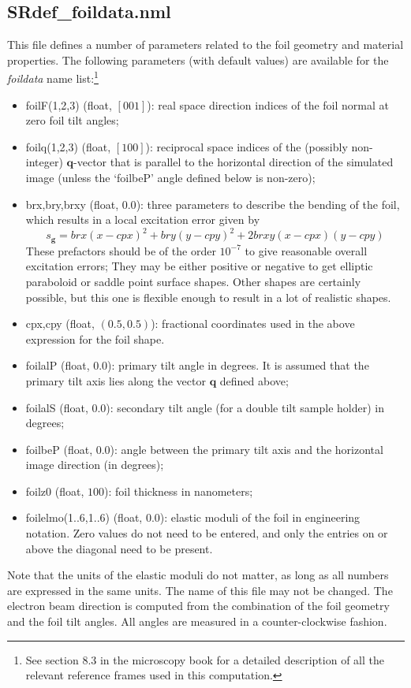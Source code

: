 \documentclass[11pt]{article}
\begin{document}
\subsection{SRdef\_foildata.nml}
This file defines a number of parameters related to the foil geometry and material properties.  The following parameters (with default values) are available for the \textit{foildata} name list:\footnote{See section
8.3 in the microscopy book for a detailed description of all the relevant reference frames used in this computation.}
\begin{itemize}
\item \textsf{foilF(1,2,3)} (float, $[001]$): real space direction indices of the foil normal at zero foil tilt angles;
\item \textsf{foilq(1,2,3)} (float, $[100]$): reciprocal space indices of the (possibly non-integer) $\mathbf{q}$-vector that is parallel to the horizontal direction of the simulated image (unless the `foilbeP' angle defined below is non-zero);
\item \textsf{brx,bry,brxy} (float, $0.0$): three parameters to describe the bending of the foil, which results in a local excitation error given by
\[
	s_\mathbf{g} = brx (x-cpx)^2 + bry (y-cpy)^2 + 2 brxy (x-cpx)(y-cpy)
\]
These prefactors should be of the order $10^{-7}$ to give reasonable overall excitation errors; They may be either positive or negative to get elliptic paraboloid
or saddle point surface shapes.  Other shapes are certainly possible, but this one is flexible enough to result in a lot of realistic shapes.
\item \textsf{cpx,cpy} (float, $(0.5,0.5)$): fractional coordinates used in the above expression for the foil shape.
\item \textsf{foilalP} (float, $0.0$): primary tilt angle in degrees.  It is assumed that the primary tilt axis lies along the vector $\mathbf{q}$ defined above;
\item \textsf{foilalS} (float, $0.0$): secondary tilt angle (for a double tilt sample holder) in degrees;
\item \textsf{foilbeP} (float, $0.0$): angle between the primary tilt axis and the horizontal image direction (in degrees); 
\item \textsf{foilz0} (float, $100$): foil thickness in nanometers;
\item \textsf{foilelmo(1..6,1..6)} (float, $0.0$): elastic moduli of the foil in engineering notation.  Zero values do not need to be entered, and only the entries on or above
the diagonal need to be present.
\end{itemize}
Note that the units of the elastic moduli do not matter, as long as all numbers are expressed in the same units.  The name of this file may not be changed.
The electron beam direction is computed from the combination of the foil geometry and the foil tilt angles.  All angles are measured in a counter-clockwise fashion.
 
\end{document}
